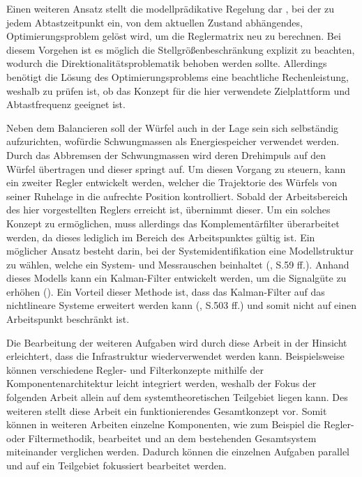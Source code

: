 Einen weiteren Ansatz stellt die modellprädikative Regelung dar \cite{MPC}, bei der zu jedem Abtastzeitpunkt ein, von dem aktuellen Zustand abhängendes, Optimierungsproblem gelöst wird, um die Reglermatrix neu zu berechnen. Bei diesem Vorgehen ist es möglich die Stellgrößenbeschränkung explizit zu beachten, wodurch die Direktionalitätsproblematik behoben werden sollte. Allerdings benötigt die Lösung des Optimierungsproblems eine beachtliche Rechenleistung, weshalb zu prüfen ist, ob das Konzept für die hier verwendete Zielplattform und Abtastfrequenz geeignet ist.

Neben dem Balancieren soll der Würfel auch in der Lage sein sich selbständig aufzurichten, wofürdie Schwungmassen als Energiespeicher verwendet werden. Durch das Abbremsen der Schwungmassen wird deren Drehimpuls auf den Würfel übertragen und dieser springt auf. Um diesen Vorgang zu steuern, kann ein zweiter Regler entwickelt werden, welcher die Trajektorie des Würfels von seiner Ruhelage in die aufrechte Position kontrolliert. Sobald der Arbeitsbereich des hier vorgestellten Reglers erreicht ist, übernimmt dieser. Um ein solches Konzept zu ermöglichen, muss allerdings das Komplementärfilter überarbeitet werden, da dieses lediglich im Bereich des Arbeitspunktes gültig ist. Ein möglicher Ansatz besteht darin,  bei der Systemidentifikation eine Modellstruktur zu wählen, welche ein System- und Messrauschen beinhaltet (\cite{UnbehauenSysId}, S.59 ff.). Anhand dieses Modells kann ein Kalman-Filter entwickelt werden, um die Signalgüte zu erhöhen (\cite{KalmanFilter}). Ein Vorteil dieser Methode ist, dass das Kalman-Filter auf das nichtlineare Systeme erweitert werden kann (\cite{AdamyNL}, S.503 ff.) und somit nicht auf einen Arbeitspunkt beschränkt ist.

Die Bearbeitung der weiteren Aufgaben wird durch diese Arbeit in der Hinsicht erleichtert, dass die Infrastruktur wiederverwendet werden kann. Beispielsweise können verschiedene Regler- und Filterkonzepte mithilfe der Komponentenarchitektur leicht integriert werden, weshalb der Fokus der folgenden Arbeit allein auf dem systemtheoretischen Teilgebiet liegen kann. Des weiteren stellt diese Arbeit ein funktionierendes Gesamtkonzept vor. Somit können in weiteren Arbeiten einzelne Komponenten, wie zum Beispiel die Regler- oder Filtermethodik, bearbeitet und an dem bestehenden Gesamtsystem miteinander verglichen werden. Dadurch können die einzelnen Aufgaben parallel und auf ein Teilgebiet fokussiert bearbeitet werden.
